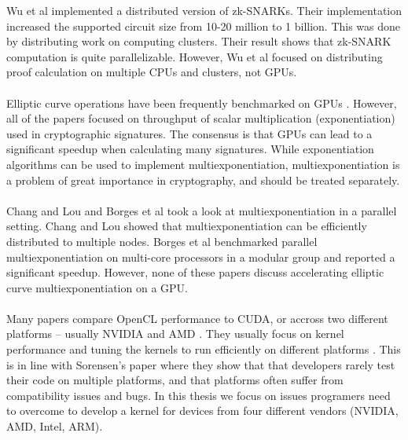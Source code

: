 
Wu et al \cite{wu2018dizk} implemented a distributed version of zk-SNARKs. Their implementation increased the supported circuit size from 10-20 million to 1 billion. This was done by distributing work on computing clusters. Their result shows that zk-SNARK computation is quite parallelizable. However, Wu et al focused on distributing proof calculation on multiple CPUs and clusters, not GPUs.\\
\\
Elliptic curve operations have been frequently benchmarked on GPUs \cite{mahefast, bernstein2010ecc2k, antao2010elliptic}. However, all of the papers focused on throughput of scalar multiplication (exponentiation) used in cryptographic signatures. The consensus is that GPUs can lead to a significant speedup when calculating many signatures. While exponentiation algorithms can be used to implement multiexponentiation, multiexponentiation is a problem of great importance in cryptography, and should be treated separately.\\
\\
Chang and Lou \cite{chang1997parallel} and Borges et al \cite{borges2017parallel} took a look at multiexponentiation in a parallel setting. Chang and Lou showed that multiexponentiation can be efficiently distributed to multiple nodes. Borges et al benchmarked parallel multiexponentiation on multi-core processors in a modular group and reported a significant speedup. However, none of these papers discuss accelerating elliptic curve multiexponentiation on a GPU.\\
\\
Many papers compare OpenCL performance to CUDA, or accross two different platforms -- usually NVIDIA and AMD \cite{fang2011comprehensive, karimi2010performance}. They usually focus on kernel performance and tuning the kernels to run efficiently on different platforms \cite{komatsu2010evaluating, henry2014toward}. This is in line with Sorensen's  paper \cite{sorensen2016hitchhiker} where they show that that developers rarely test their code on multiple platforms, and that platforms often suffer from compatibility issues and bugs. In this thesis we focus on issues programers need to overcome to develop a kernel for devices from four different vendors (NVIDIA, AMD, Intel, ARM).